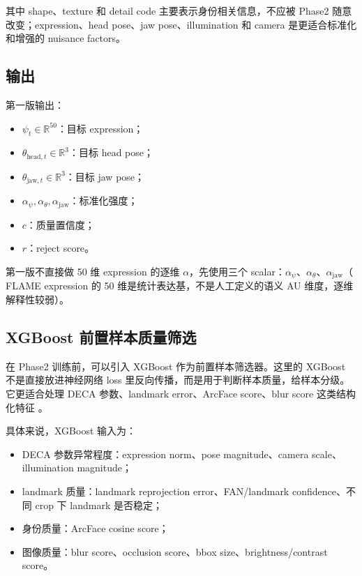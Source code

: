 \documentclass[UTF8,12pt,fontset=fandol]{ctexart}
\begin{document}
其中 shape、texture 和 detail code 主要表示身份相关信息，不应被 Phase2 随意改变；expression、head pose、jaw pose、illumination 和 camera 是更适合标准化和增强的 nuisance factors。

\subsection{输出}

第一版输出：

\begin{itemize}
    \item \( \psi_t \in \mathbb{R}^{50} \)：目标 expression；
    \item \( \theta_{\text{head},t} \in \mathbb{R}^{3} \)：目标 head pose；
    \item \( \theta_{\text{jaw},t} \in \mathbb{R}^{3} \)：目标 jaw pose；
    \item \( \alpha_{\psi},\alpha_{\theta},\alpha_{\text{jaw}} \)：标准化强度；
    \item \( c \)：质量置信度；
    \item \( r \)：reject score。
\end{itemize}

第一版不直接做 50 维 expression 的逐维 \(\alpha\)，先使用三个 scalar：\(\alpha_{\psi}\)、\(\alpha_{\theta}\)、\(\alpha_{\text{jaw}}\)（ FLAME expression 的 50 维是统计表达基，不是人工定义的语义 AU 维度，逐维解释性较弱）。

\subsection{XGBoost 前置样本质量筛选}

在 Phase2 训练前，可以引入 XGBoost 作为前置样本筛选器。这里的 XGBoost 不是直接放进神经网络 loss 里反向传播，而是用于判断样本质量，给样本分级。它更适合处理 DECA 参数、landmark error、ArcFace score、blur score 这类结构化特征 \cite{xgboost2016}。

具体来说，XGBoost 输入为：

\begin{itemize}
    \item DECA 参数异常程度：expression norm、pose magnitude、camera scale、illumination magnitude；
    \item landmark 质量：landmark reprojection error、FAN/landmark confidence、不同 crop 下 landmark 是否稳定；
    \item 身份质量：ArcFace cosine score；
    \item 图像质量：blur score、occlusion score、bbox size、brightness/contrast score。
\end{itemize}
\end{document}
